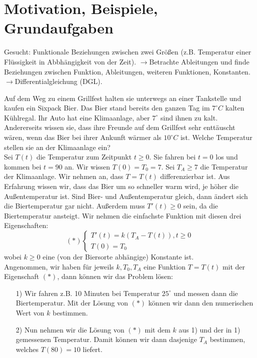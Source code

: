\chapter{Motivation, Beispiele, Grundaufgaben}
Gesucht: Funktionale Beziehungen zwischen zwei Gr\"o\ss en (z.B. Temperatur einer Flüssigkeit in Abbh\"angigkeit von der Zeit). $ \rightarrow  $Betrachte Ableitungen und finde Beziehungen zwischen Funktion, Ableitungen, weiteren Funktionen, Konstanten.$ \rightarrow $Differentialgleichung (DGL).\\
\begin{beispiel}[Bier]
	Auf dem Weg zu einem Grillfest halten sie unterwegs an einer Tankstelle und kaufen ein Sixpack Bier. Das Bier stand bereits den ganzen Tag im $ 7^\circ C $ kalten K\"uhlregal. Ihr Auto hat eine Klimaanlage, aber $ 7^\circ $ sind ihnen zu kalt. Andererseits wissen sie, dass ihre Freunde auf dem Grillfest sehr entt\"auscht w\"aren, wenn das Bier bei ihrer Ankunft w\"armer als $ 10^\circ C $ ist. Welche Temperatur stellen sie an der Klimaanlage ein?\\
	Sei $ T(t) $ die Temperatur zum Zeitpunkt $ t\geq 0 $. Sie fahren bei $ t=0 $ los und kommen bei $ t=90 $ an. Wir wissen $ T(0)=T_0=7 $. Sei $ T_A\geq 7 $ die Temperatur der Klimaanlage. Wir nehmen an, dass $ T=T(t) $ differenzierbar ist. Aus Erfahrung wissen wir, dass das Bier um so schneller warm wird, je h\"oher die Au\ss entemperatur ist. Sind Bier- und Au\ss entemperatur gleich, dann \"andert sich die Biertemperatur gar nicht. Au\ss erdem muss $ T'(t)\geq 0 $ sein, da die Biertemperatur ansteigt. Wir nehmen die einfachste Funktion mit diesen drei Eigenschaften:
	\[ (\ast)\begin{cases}
	 T'(t)=k(T_A-T(t)), t\geq 0\\
	 T(0)=T_0
	\end{cases} \]
	wobei $ k\geq 0 $ eine (von der Biersorte abh\"angige) Konstante ist.\\
	Angenommen, wir haben f\"ur jeweils $ k, T_0, T_A $ eine Funktion $ T=T(t) $ mit der Eigenschaft $ (\ast) $, dann k\"onnen wir das Problem l\"osen:
	\begin{enumerate}
		\item[1)] Wir fahren z.B. 10 Minuten bei Temperatur $ 25^\circ $ und messen dann die Biertemperatur. Mit der L\"osung von $ (\ast) $ k\"onnen wir dann den numerischen Wert von $ k $ bestimmen.
		\item[2)] Nun nehmen wir die L\"osung von $ (\ast) $ mit dem $ k $ aus 1) und der in 1) gemessenen Temperatur. Damit k\"onnen wir dann dasjenige $ T_A $ bestimmen, welches $ T(80)=10 $ liefert.\\

\end{enumerate}
\end{beispiel}
